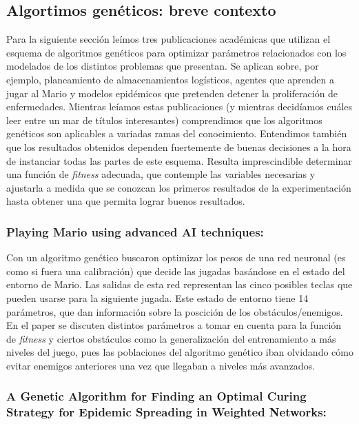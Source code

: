 \subsection{Algortimos genéticos: breve contexto}

Para la siguiente sección leímos tres publicaciones académicas que utilizan el esquema de algoritmos genéticos para optimizar parámetros relacionados con los modelados de los distintos problemas que presentan. Se aplican sobre, por ejemplo, planeamiento de almacenamientos logísticos\cite{warehouse}, agentes que aprenden a jugar al Mario\cite{mario} y modelos epidémicos que pretenden detener la proliferación de enfermedades\cite{epidemic}. Mientras leíamos estas publicaciones (y mientras decidíamos cuáles leer entre un mar de títulos interesantes) comprendimos que los algoritmos genéticos son aplicables a variadas ramas del conocimiento. Entendimos también que los resultados obtenidos dependen fuertemente de buenas decisiones a la hora de instanciar todas las partes de este esquema. Resulta imprescindible determinar una función de \emph{fitness} adecuada, que contemple las variables necesarias y ajustarla a medida que se conozcan los primeros resultados de la experimentación hasta obtener una que permita lograr buenos resultados.


\subsubsection*{Playing Mario using advanced AI techniques:}

Con un algoritmo genético buscaron optimizar los pesos de una red neuronal (es como si fuera una calibración) que decide las jugadas basándose en el estado del entorno de Mario. Las salidas de esta red representan las cinco posibles teclas que pueden usarse para la siguiente jugada.
Este estado de entorno tiene 14 parámetros, que dan información sobre la poscición de los obstáculos/enemigos.
En el paper se discuten distintos parámetros a tomar en cuenta para la función de \emph{fitness} y ciertos obstáculos como la generalización del entrenamiento a más niveles del juego, pues las poblaciones del algoritmo genético iban olvidando cómo evitar enemigos anteriores una vez que llegaban a niveles más avanzados.

\subsubsection*{A Genetic Algorithm for Finding an Optimal Curing Strategy for Epidemic Spreading in Weighted Networks:}

